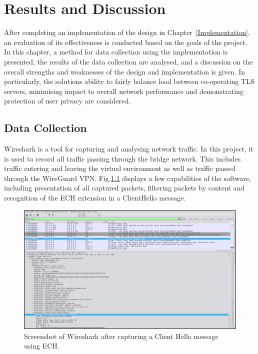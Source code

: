 \chapter{Results and Discussion}\label{Results}

After completing an implementation of the design in Chapter~\ref{Implementation}, an evaluation of its effectiveness is conducted based on the goals of the project. In this chapter, a method for data collection using the implementation is presented, the results of the data collection are analysed, and a discussion on the overall strengths and weaknesses of the design and implementation is given. In particularly, the solutions ability to fairly balance load between co-operating TLS servers, minimising impact to overall network performance and demonstrating protection of user privacy are considered.





\section{Data Collection}

Wireshark is a tool for capturing and analysing network traffic. In this project, it is used to record all traffic passing through the bridge network. This includes traffic entering and leaving the virtual environment as well as traffic passed through the WireGuard VPN. Fig.\ref{wireshark_screenshot_figure} displays a few capabilities of the software, including presentation of all captured packets, filtering packets by content and recognition of the ECH extension in a ClientHello message.

\begin{figure}[ht]
\centerline{\includegraphics[width=120mm]{images/wireshark.png}}
\caption[Screenshot of Wireshark after capturing a Client Hello message using ECH]{Screenshot of Wireshark after capturing a Client Hello message using ECH.}
\label{wireshark_screenshot_figure}
\end{figure}









